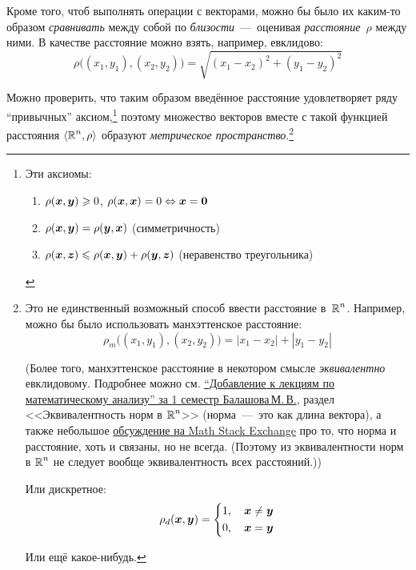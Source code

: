 \documentclass[a4paper,12pt]{article}
\begin{document}
  Кроме того, чтоб выполнять операции с векторами, можно бы было их каким-то образом \emph{сравнивать} между собой по \emph{близости}~---~оценивая \emph{расстояние}~$\rho$ между ними.
  В качестве расстояние можно взять, например, евклидово:
  \[
    \rho\bigl((x_1, y_1), (x_2, y_2)\bigr) = \sqrt{(x_1 - x_2)^2 + (y_1 - y_2)^2}
  \]

  Можно проверить, что таким образом введённое расстояние удовлетворяет ряду ``привычных'' аксиом,\footnote{
    Эти аксиомы:
    \begin{enumerate}
      \item $\rho(\boldsymbol x, \boldsymbol y) \geqslant 0$, $\rho(\boldsymbol x, \boldsymbol x) = 0 \Leftrightarrow \boldsymbol x = \boldsymbol 0$
      \item $\rho(\boldsymbol x, \boldsymbol y) = \rho(\boldsymbol y, \boldsymbol x)$ (симметричность)
      \item $\rho(\boldsymbol x, \boldsymbol z) \leqslant \rho(\boldsymbol x, \boldsymbol y) + \rho(\boldsymbol y, \boldsymbol z)$ (неравенство треугольника)
    \end{enumerate}
  } поэтому множество векторов вместе с такой функцией расстояния $\langle\operatorname{\mathbb R}^n, \rho\rangle$ образуют \emph{метрическое пространство}.\footnote{
    Это не единственный возможный способ ввести расстояние в~$\operatorname{\mathbb R}^n$.
    Например, можно бы было использовать манхэттенское расстояние:
    \[
      \rho_m\bigl((x_1, y_1), (x_2, y_2)\bigr) = |x_1 - x_2| + |y_1 - y_2|
    \]

    (Более того, манхэттенское расстояние в некотором смысле \emph{эквивалентно} евклидовому.
    Подробнее можно см. \href{https://mipt.ru/institute-departments/kafedra-vysshey-matematiki/study_docs/books_lections}{``Добавление к лекциям по математическому анализу'' за 1 семестр Балашова\,М.\,В.}, раздел <<Эквивалентность норм в $\operatorname{\mathbb R}^n$>> (норма~---~это как длина вектора), а также небольшое \href{https://math.stackexchange.com/questions/172028/difference-between-norm-and-distance}{обсуждение на Math Stack Exchange} про то, что норма и расстояние, хоть и связаны, но не всегда.
    (Поэтому из эквивалентности норм в $\operatorname{\mathbb R}^n$ не следует вообще эквивалентность всех расстояний.))

    Или дискретное:
    \[
      \rho_d(\boldsymbol x, \boldsymbol y) = \left\{
        \begin{aligned}
          1,\quad \boldsymbol x \not= \boldsymbol y\\
          0,\quad \boldsymbol x = \boldsymbol y
        \end{aligned}
      \right.
    \]

    Или ещё какое-нибудь.
  }
\end{document}
